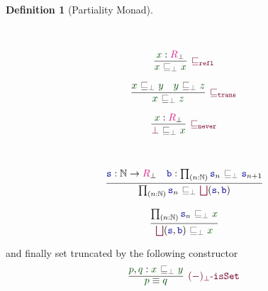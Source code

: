 \documentclass[twoside,11pt,openright]{report}
\theoremstyle{plain} %
\theoremstyle{definition}
\newtheorem{defn}[thm]{Definition}%
\theoremstyle{remark}
\newcommand*{\term}[1]{\textcolor{green!30!black}{#1}} %
\newcommand*{\type}[1]{\textcolor{magenta!90!black}{#1}}
\newcommand*{\relation}[1]{\textcolor{gray!75!black}{\ensuremath{\mathtt{#1}}}}
\newcommand*{\function}[1]{\textcolor{blue!60!black}{\ensuremath{\mathtt{#1}}}}
\newcommand*{\constructor}[1]{\textcolor{purple!60!black}{\ensuremath{\mathtt{#1}}}}
\begin{document}
\begin{defn}[Partiality Monad]
\begin{center}
\begin{minipage}{0.45\linewidth}
    \end{minipage}
  \end{center}
  \strut\\[-15mm]
  \begin{center}
    \begin{minipage}{0.25\linewidth}
      \begin{equation}
        \vcenter{\infer[\constructor{\sqsubseteq_{refl}}]{\term{x}~\relation{\sqsubseteq_{\bot}}~\term{x}}{\term{x} : \type{R}_\bot}}
      \end{equation}
    \end{minipage}
    \hfill
    \begin{minipage}{0.35\linewidth}
      \begin{equation}
        \vcenter{\infer[\constructor{\sqsubseteq_{trans}}]{\term{x}~\relation{\sqsubseteq_{\bot}}~\term{z}}{\term{x}~\relation{\sqsubseteq_{\bot}}~\term{y} & \term{y}~\relation{\sqsubseteq_{\bot}}~\term{z}}}
      \end{equation}
    \end{minipage}
    \hfill
    \begin{minipage}{0.25\linewidth}
      \begin{equation}
        \vcenter{\infer[\constructor{\sqsubseteq_{never}}]{\constructor{\bot}~\relation{\sqsubseteq_{\bot}}~\term{x}}{\term{x} : \type{R}_\bot}}
      \end{equation}
    \end{minipage}
  \end{center}
  \strut\\[-15mm]
  \begin{center}
    \hfill
    \begin{minipage}{0.50\linewidth}
      \begin{equation}
        \vcenter{\infer{\prod_{(n : \mathbb{N})} \function{s}_n~\relation{\sqsubseteq_{\bot}}~\constructor{\bigsqcup}(\function{s},\function{b})}{\function{s} : \mathbb{N} \rightarrow \type{R}_\bot & \function{b} : \prod_{(n : \mathbb{N})} \function{s}_n~\relation{\sqsubseteq_{\bot}}~\function{s}_{n+1} }}
      \end{equation}
    \end{minipage}
    \hfill
    \begin{minipage}{0.3\linewidth}
      \begin{equation}
        \vcenter{\infer{\constructor{\bigsqcup}(\function{s},\function{b})~\relation{\sqsubseteq_{\bot}}~\term{x}}{\prod_{(n:\mathbb{N})} \function{s}_n~\relation{\sqsubseteq_{\bot}}~\term{x}}}
      \end{equation}
    \end{minipage}
  \end{center}
  and finally set truncated by the following constructor
  \begin{equation}
    \vcenter{\infer[\constructor{(-)_\bot\text{-}isSet}]{\term{p} \equiv \term{q}}{\term{p} , \term{q} : \term{x}~\relation{\sqsubseteq_{\bot}}~\term{y}}}
  \end{equation}
\end{defn}
\end{document}
